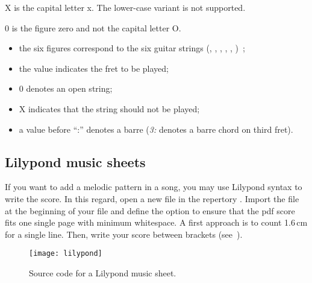 \begin{nota}
  X is the capital letter x. The lower-case variant is not supported.
  
  0 is the figure zero and not the capital letter O.
\end{nota}

\begin{itemize}
\item the six figures correspond to the six guitar strings
  (, , , ,
  , )~;
\item the value indicates the fret to be played;
\item 0 denotes an open string;
\item X indicates that the string should not be played;
\item a value before ``:'' denotes a barre (\emph{3:} denotes a barre chord on third fret).
\end{itemize}

\subsection{Lilypond music sheets}

If you want to add a melodic pattern in a song, you may use Lilypond
syntax to write the score. In this regard, open a new file
 in the repertory .
Import the file  at the beginning of your file and define
the option  to ensure that the pdf score fits
one single page with minimum whitespace. A first approach is to count
1.6\,cm for a single line. Then, write your score between brackets
(see~).

\begin{figure}
  \begin{minipage}[b]{\linewidth}
    \centering
    \texttt{[image: lilypond]}
    \vspace{0.5cm}
  \end{minipage}

  \begin{minipage}[b]{\linewidth}
  \end{minipage}
  \caption{Source code for a Lilypond music sheet.}
  \label{fig:lilypond}
\end{figure}

